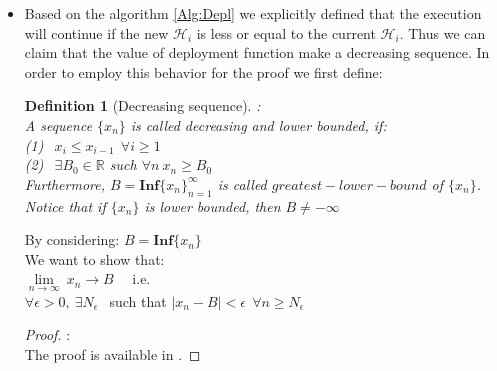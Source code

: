 \documentclass[twocolumn]{svjour3}       %
\newtheorem{mydef}{Definition}
\begin{document}
\begin{itemize}

\item Based on the algorithm \ref{Alg:Depl} we explicitly defined that the execution will continue if the new $\mathcal{H}_i$ is less or equal to the current $\mathcal{H}_i$. Thus we can claim that the value of deployment function make a decreasing sequence. In order to employ this behavior for the proof we first define:

\begin{mydef}[Decreasing sequence]:\\
\textnormal{A sequence $\{x_n\}$ is called decreasing and lower bounded, if:}\\
(1) $~~x_i\leq x_{i-1}~~\forall i \geq 1$\\
(2) $~~\exists B_0 \in \mathbb{R}$ \textnormal{ such } $\forall n ~x_n \geq B_0$\\
\textnormal{
Furthermore, $B=\mathbf{Inf}\{x_n\}_{n=1}^{\infty}$ is called $greatest-lower-bound$ of $\{x_n\}$. Notice that if $\{x_n\}$ is lower bounded, then $B \neq -\infty$
}
\end{mydef}

\begin{lemma}
\label{lema1}
\textnormal{By considering:
$B=\mathbf{Inf}\{x_n\}$\\
We want to show that:}\\
%
$\lim\limits_{n \rightarrow \infty}~x_n \rightarrow B$ ~~i.e. \\

$\forall \epsilon>0, ~\exists N_\epsilon ~~$ \textnormal{ such that }$|x_n-B|<\epsilon~~\forall n\geq N_{\epsilon}$

\end{lemma}
\begin{proof}:\\
\label{proof1}
The proof is available in \cite{tagkey1997}.


\end{proof}
\end{itemize}
\end{document}
